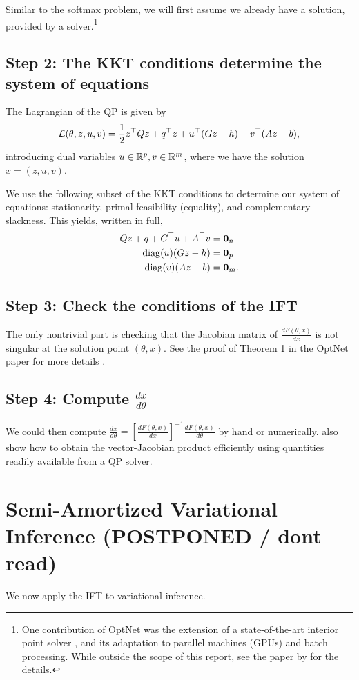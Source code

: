 \documentclass[11pt]{article}
\begin{document}
Similar to the softmax problem, we will first assume we already have a solution,
provided by a solver.\footnote{
One contribution of OptNet was the extension of a state-of-the-art interior point
solver \citep{optnet}, and its adaptation to parallel machines (GPUs) and batch processing.
While outside the scope of this report, see the paper by \citet{optnet} for the details.
}

\subsection*{Step 2: The KKT conditions determine the system of equations}
The Lagrangian of the QP is given by
$$
\mathcal{L}(\theta,z,u,v) = \frac12 z^\top Qz + q^\top z + u^\top(Gz-h) + v^\top(Az-b),
$$
introducing dual variables $u\in\mathbb{R}^p,v\in\mathbb{R}^m$,
where we have the solution $x = (z,u,v)$.

We use the following subset of the KKT conditions to determine our system of equations:
stationarity, primal feasibility (equality), and complementary slackness.
This yields, written in full,
\begin{equation}
\begin{aligned}
Qz + q + G^\top u + A^\top v  &= \mathbf{0}_n\\
\mathrm{diag}(u)(Gz-h) &= \mathbf{0}_p\\
\mathrm{diag}(v)(Az-b) &= \mathbf{0}_m.
\end{aligned}
\end{equation}

\subsection*{Step 3: Check the conditions of the IFT}
The only nontrivial part is checking that the Jacobian matrix of $\frac{dF(\theta,x)}{dx}$ is
not singular at the solution point $(\theta,x)$.
See the proof of Theorem 1 in the OptNet paper for more details \citep{optnet}.

\subsection*{Step 4: Compute $\frac{dx}{d\theta}$}
We could then compute
$\frac{dx}{d\theta} = \left[\frac{dF(\theta,x)}{dx}\right]^{-1}\frac{dF(\theta,x)}{d\theta}$
by hand or numerically.
\citet{optnet} also show how to obtain the vector-Jacobian product efficiently
using quantities readily available from a QP solver.

\section{Semi-Amortized Variational Inference (POSTPONED / dont read)}
We now apply the IFT to variational inference.
\end{document}
